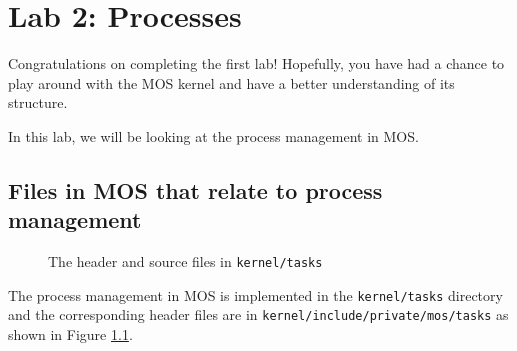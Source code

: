 \chapter{Lab 2: Processes}

Congratulations on completing the first lab! Hopefully, you have had a chance to play
around with the MOS kernel and have a better understanding of its structure.

In this lab, we will be looking at the process management in MOS.

\section{Files in MOS that relate to process management}

\begin{figure}[ht]
    \centering
    \caption{The header and source files in \texttt{kernel/tasks}}
    \label{fig:mos-process-management-files}
\end{figure}

The process management in MOS is implemented in the \texttt{kernel/tasks} directory and the
corresponding header files are in \texttt{kernel/include/private/mos/tasks} as shown in
Figure \ref{fig:mos-process-management-files}.

